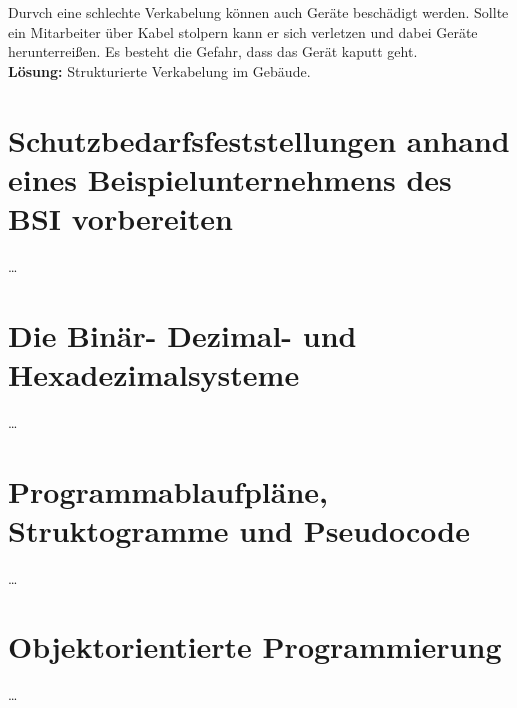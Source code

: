 \documentclass[a4paper, 12pt]{report}
\begin{document}
\begin{multicols}{2}
Durvch eine schlechte Verkabelung können auch Geräte beschädigt werden. Sollte
ein Mitarbeiter über Kabel stolpern kann er sich verletzen und dabei Geräte 
herunterreißen. Es besteht die Gefahr, dass das Gerät kaputt geht. \\

\textbf{Lösung:} Strukturierte Verkabelung im Gebäude.

\section{Schutzbedarfsfeststellungen anhand eines Beispielunternehmens des BSI 
vorbereiten} %
\dots

\section{Die Binär- Dezimal- und Hexadezimalsysteme}
\dots

\section{Programmablaufpläne, Struktogramme und Pseudocode}
\dots

\section{Objektorientierte Programmierung}
\dots
\end{multicols}
\end{document}
